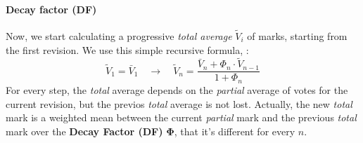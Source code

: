 \documentclass[a4paper,11pt]{article}
\newcommand{\ph}[1]{$\tilde{V}_#1$ }
\begin{document}
\paragraph{Decay factor (DF)} Now, we start calculating a progressive \emph{total average} 
\ph{i} of marks, starting from the first revision. We use this simple recursive formula, :
\begin{equation} \label{eq:V_hat1}
\tilde{V}_1 = \bar{V}_1  \quad\longrightarrow\quad \tilde{V}_n = \frac{\bar{V}_n + \Phi_n 
\cdot \tilde{V}_{n-1}}{1+ \Phi_n} 
\end{equation}
For every step, the \emph{total} average depends on the \emph{partial} average of votes 
for the current revision, but the previos \emph{total} average is not lost. Actually, the 
new \emph{total} mark is a weighted mean between the current \emph{partial} mark and 
the previous \emph{total} mark over the \textbf{Decay Factor (DF)} $\mathbf{\Phi}$, that 
it's different for every $n$.
\end{document}
